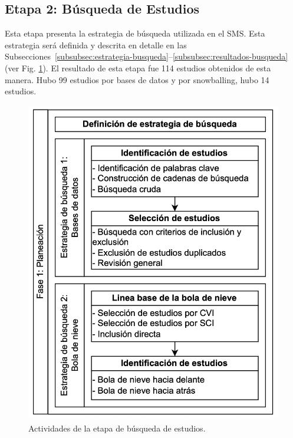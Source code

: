 \newcommand{\totalStudies}{114}
\newcommand{\databaseStudies}{99}
\newcommand{\snowballStudies}{14}
\newcommand{\directInclusionStudies}{0}



\subsection{Etapa 2: Búsqueda de Estudios}

Esta etapa presenta la estrategia de búsqueda utilizada en el SMS\@. Esta estrategia será definida y descrita en detalle en las Subsecciones~\ref{subsubsec:estrategia-busqueda}--\ref{subsubsec:resultados-busqueda} (ver Fig. \ref{fig:busqueda-estudios}).
El resultado de esta etapa fue \totalStudies{} estudios obtenidos de esta manera. Hubo \databaseStudies{} estudios por bases de datos y por snowballing, hubo \snowballStudies{} estudios.


\begin{figure}[htbp]
	\centering
	\vspace{10pt}
	\includegraphics[scale=0.3]{resources/figures/fig03-fase1-planeacion.png}
	\vspace{6pt}
	\caption{Actividades de la etapa de búsqueda de estudios.}
	\label{fig:busqueda-estudios}
\end{figure}




